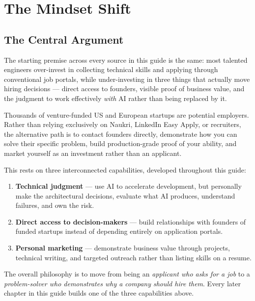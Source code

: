 \chapter{The Mindset Shift}
\label{ch:foundations}

\section{The Central Argument}

The starting premise across every source in this guide is the same: most talented engineers over-invest in
collecting technical skills and applying through conventional job portals, while under-investing in three things
that actually move hiring decisions --- direct access to founders, visible proof of business value, and the
judgment to work effectively \emph{with} AI rather than being replaced by it.

Thousands of venture-funded US and European startups are potential employers. Rather than relying exclusively on
Naukri, LinkedIn Easy Apply, or recruiters, the alternative path is to contact founders directly, demonstrate how
you can solve their specific problem, build production-grade proof of your ability, and market yourself as an
investment rather than an applicant.

This rests on three interconnected capabilities, developed throughout this guide:

\begin{enumerate}
  \item \textbf{Technical judgment} --- use AI to accelerate development, but personally make the architectural
  decisions, evaluate what AI produces, understand failures, and own the risk.
  \item \textbf{Direct access to decision-makers} --- build relationships with founders of funded startups
  instead of depending entirely on application portals.
  \item \textbf{Personal marketing} --- demonstrate business value through projects, technical writing, and
  targeted outreach rather than listing skills on a resume.
\end{enumerate}

\begin{keytakeaway}
The overall philosophy is to move from being an \emph{applicant who asks for a job} to a
\emph{problem-solver who demonstrates why a company should hire them}. Every later chapter in this guide builds
one of the three capabilities above.
\end{keytakeaway}

